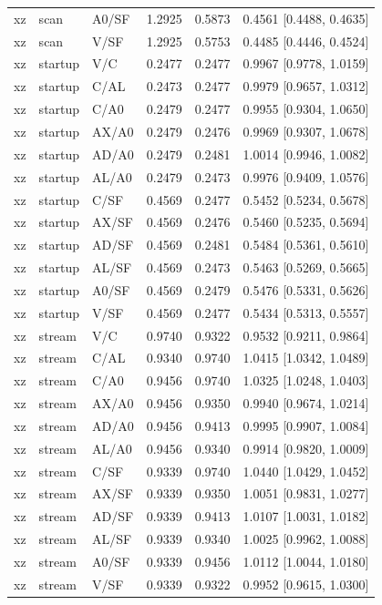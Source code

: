 \begin{longtable}{lllrrl}
xz & scan & A0/SF & 1.2925 & 0.5873 & 0.4561 [0.4488, 0.4635] \\
xz & scan & V/SF & 1.2925 & 0.5753 & 0.4485 [0.4446, 0.4524] \\
xz & startup & V/C & 0.2477 & 0.2477 & 0.9967 [0.9778, 1.0159] \\
xz & startup & C/AL & 0.2473 & 0.2477 & 0.9979 [0.9657, 1.0312] \\
xz & startup & C/A0 & 0.2479 & 0.2477 & 0.9955 [0.9304, 1.0650] \\
xz & startup & AX/A0 & 0.2479 & 0.2476 & 0.9969 [0.9307, 1.0678] \\
xz & startup & AD/A0 & 0.2479 & 0.2481 & 1.0014 [0.9946, 1.0082] \\
xz & startup & AL/A0 & 0.2479 & 0.2473 & 0.9976 [0.9409, 1.0576] \\
xz & startup & C/SF & 0.4569 & 0.2477 & 0.5452 [0.5234, 0.5678] \\
xz & startup & AX/SF & 0.4569 & 0.2476 & 0.5460 [0.5235, 0.5694] \\
xz & startup & AD/SF & 0.4569 & 0.2481 & 0.5484 [0.5361, 0.5610] \\
xz & startup & AL/SF & 0.4569 & 0.2473 & 0.5463 [0.5269, 0.5665] \\
xz & startup & A0/SF & 0.4569 & 0.2479 & 0.5476 [0.5331, 0.5626] \\
xz & startup & V/SF & 0.4569 & 0.2477 & 0.5434 [0.5313, 0.5557] \\
xz & stream & V/C & 0.9740 & 0.9322 & 0.9532 [0.9211, 0.9864] \\
xz & stream & C/AL & 0.9340 & 0.9740 & 1.0415 [1.0342, 1.0489] \\
xz & stream & C/A0 & 0.9456 & 0.9740 & 1.0325 [1.0248, 1.0403] \\
xz & stream & AX/A0 & 0.9456 & 0.9350 & 0.9940 [0.9674, 1.0214] \\
xz & stream & AD/A0 & 0.9456 & 0.9413 & 0.9995 [0.9907, 1.0084] \\
xz & stream & AL/A0 & 0.9456 & 0.9340 & 0.9914 [0.9820, 1.0009] \\
xz & stream & C/SF & 0.9339 & 0.9740 & 1.0440 [1.0429, 1.0452] \\
xz & stream & AX/SF & 0.9339 & 0.9350 & 1.0051 [0.9831, 1.0277] \\
xz & stream & AD/SF & 0.9339 & 0.9413 & 1.0107 [1.0031, 1.0182] \\
xz & stream & AL/SF & 0.9339 & 0.9340 & 1.0025 [0.9962, 1.0088] \\
xz & stream & A0/SF & 0.9339 & 0.9456 & 1.0112 [1.0044, 1.0180] \\
xz & stream & V/SF & 0.9339 & 0.9322 & 0.9952 [0.9615, 1.0300] \\
\bottomrule\end{longtable}
